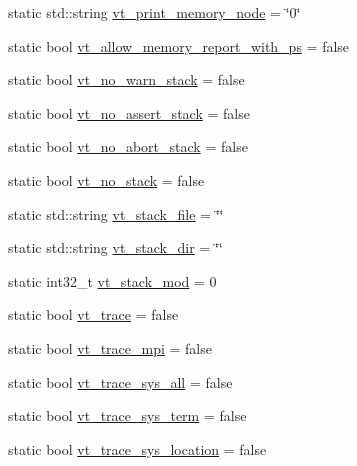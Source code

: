 \begin{DoxyCompactItemize}
static std\+::string \hyperlink{structvt_1_1arguments_1_1_arg_config_af483ff7b7b48be408f82e0117f358fe1}{vt\+\_\+print\+\_\+memory\+\_\+node} = \char`\"{}0\char`\"{}
\item 
static bool \hyperlink{structvt_1_1arguments_1_1_arg_config_a867cfaedc10180e4c78ad7f92e998852}{vt\+\_\+allow\+\_\+memory\+\_\+report\+\_\+with\+\_\+ps} = false
\item 
static bool \hyperlink{structvt_1_1arguments_1_1_arg_config_a16f70ff1b626b624e04d21e87a5b08ee}{vt\+\_\+no\+\_\+warn\+\_\+stack} = false
\item 
static bool \hyperlink{structvt_1_1arguments_1_1_arg_config_a21cfd06769807c11dad7729874c11dc4}{vt\+\_\+no\+\_\+assert\+\_\+stack} = false
\item 
static bool \hyperlink{structvt_1_1arguments_1_1_arg_config_a97f4bbea1134d1760b9a9858f7218852}{vt\+\_\+no\+\_\+abort\+\_\+stack} = false
\item 
static bool \hyperlink{structvt_1_1arguments_1_1_arg_config_a4aeb67323853bbd3d2d6092931895f0f}{vt\+\_\+no\+\_\+stack} = false
\item 
static std\+::string \hyperlink{structvt_1_1arguments_1_1_arg_config_a2fadbf7acefac8e3c5b4859f69956df4}{vt\+\_\+stack\+\_\+file} = \char`\"{}\char`\"{}
\item 
static std\+::string \hyperlink{structvt_1_1arguments_1_1_arg_config_a98165ce3647429d761c15c4b7e02226b}{vt\+\_\+stack\+\_\+dir} = \char`\"{}\char`\"{}
\item 
static int32\+\_\+t \hyperlink{structvt_1_1arguments_1_1_arg_config_a5f21f67c8c70d8c0f87f71c62ad3d206}{vt\+\_\+stack\+\_\+mod} = 0
\item 
static bool \hyperlink{structvt_1_1arguments_1_1_arg_config_a61bc1a82c8b643dc430d07f4da316f50}{vt\+\_\+trace} = false
\item 
static bool \hyperlink{structvt_1_1arguments_1_1_arg_config_a50f49d87bb92a729b22102b4da66030a}{vt\+\_\+trace\+\_\+mpi} = false
\item 
static bool \hyperlink{structvt_1_1arguments_1_1_arg_config_a0f29a730468e776a3281e5cb2694395c}{vt\+\_\+trace\+\_\+sys\+\_\+all} = false
\item 
static bool \hyperlink{structvt_1_1arguments_1_1_arg_config_a3618f4c676020355d57dd29623959224}{vt\+\_\+trace\+\_\+sys\+\_\+term} = false
\item 
static bool \hyperlink{structvt_1_1arguments_1_1_arg_config_ad810a33c24ce08006af0bafeffce9ec8}{vt\+\_\+trace\+\_\+sys\+\_\+location} = false
\item 

\end{DoxyCompactItemize}

